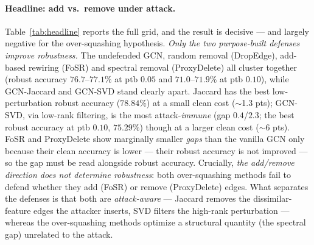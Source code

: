 \documentclass[10pt]{article}
\begin{document}
\paragraph{Headline: add vs.\ remove under attack.} Table~\ref{tab:headline} reports the full grid, and
the result is decisive --- and largely negative for the over-squashing hypothesis. \emph{Only the two
purpose-built defenses improve robustness.} The undefended GCN, random removal (DropEdge), add-based
rewiring (FoSR) and spectral removal (ProxyDelete) all cluster together (robust accuracy $76.7$--$77.1\%$
at ptb $0.05$ and $71.0$--$71.9\%$ at ptb $0.10$), while GCN-Jaccard and GCN-SVD stand clearly apart.
Jaccard has the best low-perturbation robust accuracy ($78.84\%$) at a small clean cost ($\sim$1.3 pts);
GCN-SVD, via low-rank filtering, is the most attack-\emph{immune} (gap $0.4$/$2.3$; the best robust
accuracy at ptb $0.10$, $75.29\%$) though at a larger clean cost ($\sim$6 pts). FoSR and ProxyDelete show
marginally smaller \emph{gaps} than the vanilla GCN only because their clean accuracy is lower --- their
robust accuracy is not improved --- so the gap must be read alongside robust accuracy. Crucially,
\emph{the add/remove direction does not determine robustness}: both over-squashing methods fail to defend
whether they add (FoSR) or remove (ProxyDelete) edges. What separates the defenses is that both are
\emph{attack-aware} --- Jaccard removes the dissimilar-feature edges the attacker inserts, SVD filters the
high-rank perturbation --- whereas the over-squashing methods optimize a structural quantity (the spectral
gap) unrelated to the attack.
\end{document}
